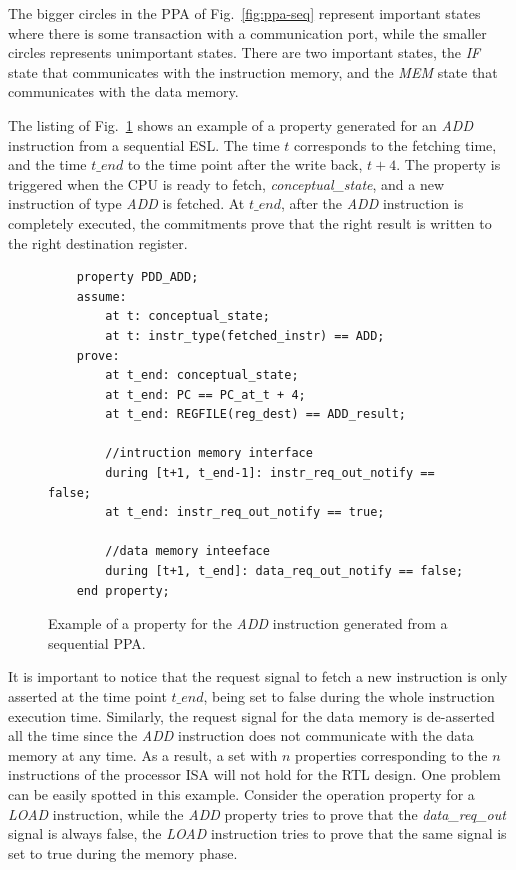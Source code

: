 The bigger circles in the PPA of Fig.~\ref{fig:ppa-seq} represent important states where there is some transaction with a communication port, while the smaller circles represents unimportant states. There are two important states, the \textit{IF} state that communicates with the instruction memory, and the \textit{MEM} state that communicates with the data memory.

The listing of Fig.~\ref{fig:ex-pdd-add-ppt} shows an example of a property generated for an \textit{ADD} instruction from a sequential ESL. The time $t$ corresponds to the fetching time, and the time $t\_end$ to the time point after the write back, $t+4$. The property is triggered when the CPU is ready to fetch, \textit{conceptual\_state}, and a new instruction of type \textit{ADD} is fetched. At $t\_end$, after the \textit{ADD} instruction is completely executed, the commitments prove that the right result is written to the right destination register.

\begin{figure}[htb!]
    \begin{lstlisting}
    property PDD_ADD;
    assume:
        at t: conceptual_state;
        at t: instr_type(fetched_instr) == ADD;
    prove:
        at t_end: conceptual_state;
        at t_end: PC == PC_at_t + 4;
        at t_end: REGFILE(reg_dest) == ADD_result;
        
        //intruction memory interface
        during [t+1, t_end-1]: instr_req_out_notify == false;
        at t_end: instr_req_out_notify == true;
        
        //data memory inteeface
        during [t+1, t_end]: data_req_out_notify == false;
    end property;\end{lstlisting}
    \caption{Example of a property for the \textit{ADD} instruction generated from a sequential PPA.}
    \label{fig:ex-pdd-add-ppt}
\end{figure}

It is important to notice that the request signal to fetch a new instruction is only asserted at the time point $t\_end$, being set to false during the whole instruction execution time. Similarly, the request signal for the data memory is de-asserted all the time since the \textit{ADD} instruction does not communicate with the data memory at any time. As a result, a set with $n$ properties corresponding to the $n$ instructions of the processor ISA will not hold for the RTL design. One problem can be easily spotted in this example. Consider the operation property for a \textit{LOAD} instruction, while the \textit{ADD} property tries to prove that the \textit{data\_req\_out} signal is always false, the \textit{LOAD} instruction tries to prove that the same signal is set to true during the memory phase.

